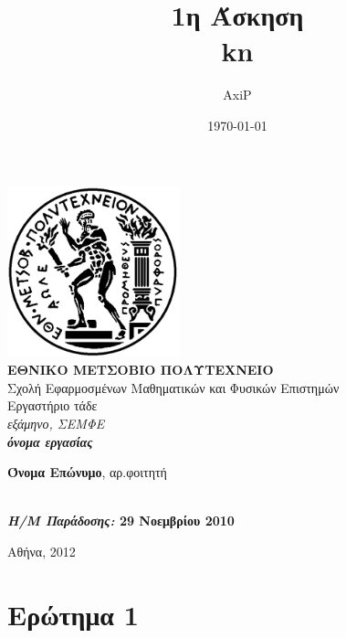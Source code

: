 \documentclass[a4paper,12pt,titlepage]{article}
\title{1η Άσκηση\\kn}
\author{AxiP}
\date{\today}
\begin{document}
\pagestyle{headings}    %

\begin{titlepage}
\begin{center}
\includegraphics[width=50mm]{pyrforos.pdf}\\[0.5cm]
\textbf{\LARGE ΕΘΝΙΚΟ ΜΕΤΣΟΒΙΟ ΠΟΛΥΤΕΧΝΕΙΟ}\\
\textrm{\Large Σχολή Εφαρμοσμένων Μαθηματικών και Φυσικών Επιστημών}\\[2.0cm]
\Huge{Εργαστήριο τάδε\\}
\Large{\textit{εξάμηνο, ΣΕΜΦΕ}}\\[2.0cm]
\Large{\textit{\textbf{όνομα εργασίας}}}\\[5.0cm]
\normalsize

\begin{minipage}{0.49\textwidth}
\begin{flushleft}
\textbf{Όνομα Επώνυμο}, αρ.φοιτητή
\end{flushleft}
\end{minipage}
\begin{minipage}{0.49\textwidth}
\begin{flushright}
\textbf{\\
\textit{Η/Μ Παράδοσης:} 29 Νοεμβρίου 2010}
\end{flushright}
\end{minipage}


\vfill
{Αθήνα, 2012}

\end{center}
\end{titlepage}

\section{Ερώτημα 1}
\end{document}
